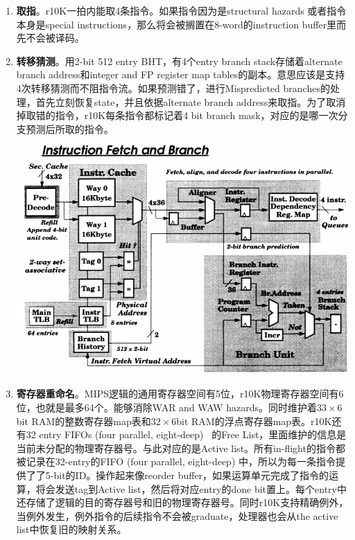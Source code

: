 \documentclass{article}
\begin{document}
	\begin{multicols}{2}
		\begin{enumerate}
			\item \textbf{取指}。r10K一拍内能取4条指令。如果指令因为是structural hazards 或者指令本身是special instructions，那么将会被搁置在8-word的instruction buffer里而先不会被译码。
			\item \textbf{转移猜测}。用2-bit 512 entry BHT，有4个entry branch stack存储着alternate branch address和integer and FP register map tables的副本。意思应该是支持4次转移猜测而不阻指令流。如果预测错了，进行Mispredicted branches的处理，首先立刻恢复state，并且依据alternate branch address来取指。为了取消掉取错的指令，r10K每条指令都标记着4 bit branch mask，对应的是哪一次分支预测后所取的指令。~\cite{mips}
			
			\includegraphics[width=\linewidth]{figs/10Kbranch.png}
			
			\item  \textbf{寄存器重命名}。MIPS逻辑的通用寄存器空间有5位，r10K物理寄存器空间有6位，也就是最多64个。能够消除WAR and WAW hazards。同时维护着$ 33\times 6 $ bit RAM的整数寄存器map表和$ 32\times 6$bit RAM的浮点寄存器map表。r10K还有32 entry FIFOs (four parallel, eight-deep)~\cite{mips}
			的Free List，里面维护的信息是当前未分配的物理寄存器号。与此对应的是Active list。所有in-flight的指令都被记录在32-entry的FIFO (four parallel, eight-deep) 中，所以为每一条指令提供了了5-bit的ID。操作起来像reorder buffer，如果运算单元完成了指令的运算，将会发送tag到Active list，然后将对应entry的done bit置上。每个entry中还存储了逻辑的目的寄存器号和旧的物理寄存器号。同时r10K支持精确例外，当例外发生，例外指令的后续指令不会被graduate，处理器也会从the active list中恢复旧的映射关系。
			

\end{enumerate}
\end{multicols}
\end{document}
